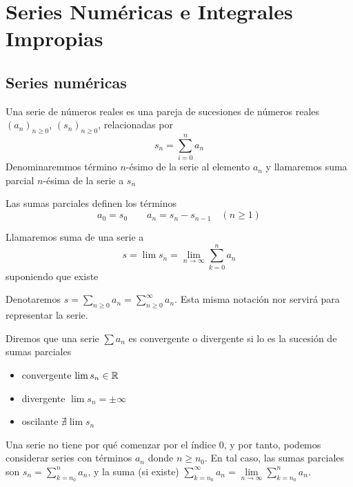 \chapter{Series Numéricas e Integrales Impropias}

\section{Series numéricas}

\begin{defi}
	Una serie de números reales es una pareja de sucesiones de números reales
	$(a_n)_{n \geq 0}$, $(s_n)_{n \geq 0}$, relacionadas por
	\[
		s_n = \sum_{i=0}^{n} a_n
	\]
	Denominaremmos término $n$-ésimo de la serie al elemento $a_n$ y llamaremos
	suma parcial $n$-ésima de la serie a $s_n$
\end{defi}
\begin{obs*}
	Las sumas parciales definen los términos
	\[
		a_0 = s_0 \qquad a_n = s_n - s_{n-1} \quad (n \geq 1)
	\]
\end{obs*}

\begin{defi}
	Llamaremos suma de una serie a
	\[
		s = \lim s_n = \lim\limits_{n \to \infty} \sum_{k=0}^{n} a_n
	\]
	suponiendo que existe
\end{defi}
\begin{obs*}
	Denotaremos $s = \sum\limits_{n \geq 0} a_n = \sum\limits_{n \geq 0}^{\infty} a_n$.
	Esta misma notación nor servirá para representar la serie.
\end{obs*}

\begin{defi}
	Diremos que una serie $\sum a_n$ es convergente o divergente si lo es la
	sucesión de sumas parciales
	\begin{itemize}
		\item convergente \qquad $\lim s_n \in \mathbb{R}$
		\item divergente  \qquad $\lim s_n = \pm \infty$
		\item oscilante \qquad $\nexists \lim s_n$
	\end{itemize}
\end{defi}

\begin{obs}
	Una serie no tiene por qué comenzar por el índice 0, y por tanto, podemos considerar
	series con términos $a_n$ donde $n \geq n_0$. En tal caso, las sumas parciales son
	$s_n = \sum\limits_{k=n_0}^n a_n$, y la suma (si existe) $\sum\limits_{k=n_0}^{\infty}
	a_n = \lim\limits_{n \to \infty} \sum\limits_{k=n_0}^n a_n$.
\end{obs}


